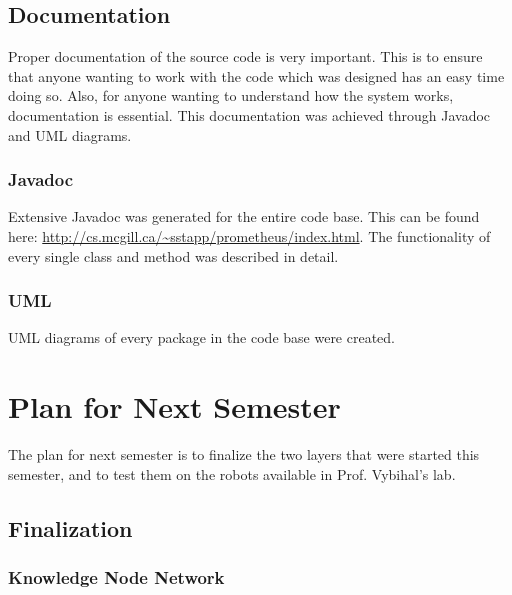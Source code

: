 \documentclass[titlepage,11pt]{article}
\begin{document}
\subsection{Documentation}

Proper documentation of the source code is very important. This is to ensure that anyone wanting to work with the code which was designed has an easy time doing so. Also, for anyone wanting to understand how the system works, documentation is essential. This documentation was achieved through Javadoc and UML diagrams.

\subsubsection{Javadoc}

Extensive Javadoc was generated for the entire code base. This can be found here: \url{http://cs.mcgill.ca/~sstapp/prometheus/index.html}. The functionality of every single class and method was described in detail.

\subsubsection{UML}

UML diagrams of every package in the code base were created.

\section{Plan for Next Semester}

The plan for next semester is to finalize the two layers that were started this semester, and to test them on the robots available in Prof. Vybihal's lab.

\subsection{Finalization}

\subsubsection{Knowledge Node Network}
\end{document}
